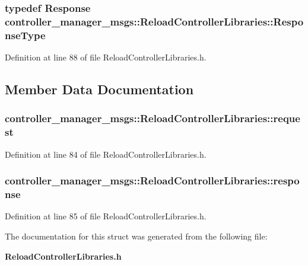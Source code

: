 \subsubsection[{\-Response\-Type}]{\setlength{\rightskip}{0pt plus 5cm}typedef {\bf \-Response} {\bf controller\-\_\-manager\-\_\-msgs\-::\-Reload\-Controller\-Libraries\-::\-Response\-Type}}\label{structcontroller__manager__msgs_1_1ReloadControllerLibraries_af3dbca7b845a8464cea77c33b96132fe}


\-Definition at line 88 of file \-Reload\-Controller\-Libraries.\-h.



\subsection{\-Member \-Data \-Documentation}
\subsubsection[{request}]{ {\bf controller\-\_\-manager\-\_\-msgs\-::\-Reload\-Controller\-Libraries\-::request}}\label{structcontroller__manager__msgs_1_1ReloadControllerLibraries_a0064074dfab6427a88ac89bf06b6f8cf}


\-Definition at line 84 of file \-Reload\-Controller\-Libraries.\-h.

\subsubsection[{response}]{ {\bf controller\-\_\-manager\-\_\-msgs\-::\-Reload\-Controller\-Libraries\-::response}}\label{structcontroller__manager__msgs_1_1ReloadControllerLibraries_a8706de2608151223f3d8da966fa2dd3b}


\-Definition at line 85 of file \-Reload\-Controller\-Libraries.\-h.



\-The documentation for this struct was generated from the following file\-:\begin{DoxyCompactItemize}
\item 
{\bf \-Reload\-Controller\-Libraries.\-h}\end{DoxyCompactItemize}
